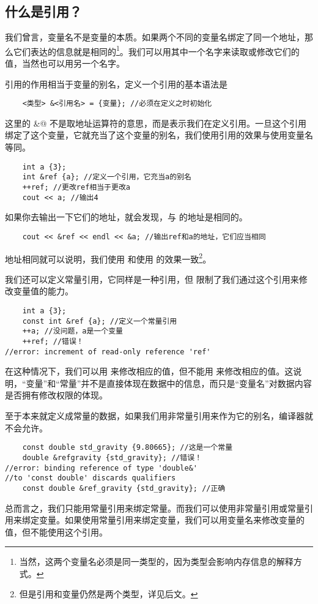 \subsection*{什么是引用？}
我们曾言，变量名不是变量的本质。如果两个不同的变量名绑定了同一个地址，那么它们表达的信息就是相同的\footnote{当然，这两个变量名必须是同一类型的，因为类型会影响内存信息的解释方式。}。我们可以用其中一个名字来读取或修改它们的值，当然也可以用另一个名字。\par
引用的作用相当于变量的别名，定义一个引用的基本语法是
\begin{lstlisting}
    <类型> &<引用名> = {变量}; //必须在定义之时初始化
\end{lstlisting}
这里的 \lstinline@&@ 不是取地址运算符的意思，而是表示我们在定义引用。一旦这个引用绑定了这个变量，它就充当了这个变量的别名，我们使用引用的效果与使用变量名等同。
\begin{lstlisting}
    int a {3};
    int &ref {a}; //定义一个引用，它充当a的别名
    ++ref; //更改ref相当于更改a
    cout << a; //输出4
\end{lstlisting}\par
如果你去输出一下它们的地址，就会发现，\lstinline@ref@ 与 \lstinline@a@ 的地址是相同的。
\begin{lstlisting}
    cout << &ref << endl << &a; //输出ref和a的地址，它们应当相同
\end{lstlisting}
地址相同就可以说明，我们使用 \lstinline@a@ 和使用 \lstinline@ref@ 的效果一致\footnote{但是引用和变量仍然是两个类型，详见后文。}。\par
我们还可以定义常量引用，它同样是一种引用，但 \lstinline@const@ 限制了我们通过这个引用来修改变量值的能力。
\begin{lstlisting}
    int a {3};
    const int &ref {a}; //定义一个常量引用
    ++a; //没问题，a是一个变量
    ++ref; //错误！
//error: increment of read-only reference 'ref'
\end{lstlisting}
在这种情况下，我们可以用 \lstinline@a@ 来修改相应的值，但不能用 \lstinline@ref@ 来修改相应的值。这说明，``变量''和``常量''并不是直接体现在数据中的信息，而只是``变量名''对数据内容是否拥有修改权限的体现。\par
至于本来就定义成常量的数据，如果我们用非常量引用来作为它的别名，编译器就不会允许。
\begin{lstlisting}
    const double std_gravity {9.80665}; //这是一个常量
    double &refgravity {std_gravity}; //错误！
//error: binding reference of type 'double&'
//to 'const double' discards qualifiers
    const double &ref_gravity {std_gravity}; //正确
\end{lstlisting}
总而言之，我们只能用常量引用来绑定常量。而我们可以使用非常量引用或常量引用来绑定变量。如果使用常量引用来绑定变量，我们可以用变量名来修改变量的值，但不能使用这个引用。\par
